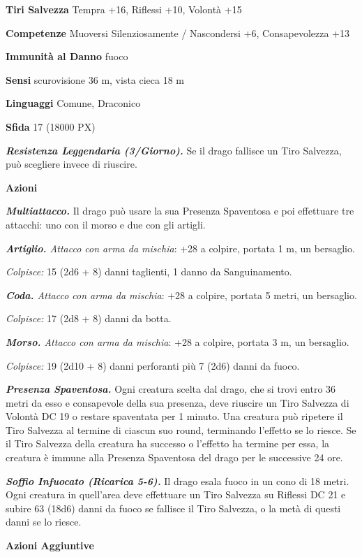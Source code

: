 \begin{multicols}{2}
	\textbf{Tiri Salvezza} Tempra +16, Riflessi +10, Volontà +15

	\textbf{Competenze} Muoversi Silenziosamente / Nascondersi +6, Consapevolezza +13

	\textbf{Immunità al Danno} fuoco

	\textbf{Sensi} scurovisione 36 m, vista cieca 18 m

	\textbf{Linguaggi} Comune, Draconico

	\textbf{Sfida} 17 (18000 PX)

	\textit{\textbf{Resistenza Leggendaria (3/Giorno).}} Se il drago fallisce un Tiro Salvezza, può scegliere invece di riuscire.

	\textbf{Azioni}

	\textit{\textbf{Multiattacco.}} Il drago può usare la sua Presenza Spaventosa e poi effettuare tre attacchi: uno con il morso e due con gli artigli.

	\textit{\textbf{Artiglio.} Attacco con arma da mischia}: +28 a colpire, portata 1 m, un bersaglio.

	\textit{Colpisce:} 15 (2d6 + 8) danni taglienti, 1 danno da Sanguinamento.

	\textit{\textbf{Coda.} Attacco con arma da mischia}: +28 a colpire, portata 5 metri, un bersaglio.

	\textit{Colpisce:} 17 (2d8 + 8) danni da botta.

	\textit{\textbf{Morso.} Attacco con arma da mischia}: +28 a colpire, portata 3 m, un bersaglio.

	\textit{Colpisce:} 19 (2d10 + 8) danni perforanti più 7 (2d6) danni da
	fuoco.

	\textit{\textbf{Presenza Spaventosa.}} Ogni creatura scelta dal drago, che si trovi entro 36 metri da esso e consapevole della sua presenza, deve riuscire un Tiro Salvezza di Volontà DC 19 o restare spaventata per 1 minuto. Una creatura può ripetere il Tiro Salvezza al termine di ciascun suo round, terminando l'effetto se lo riesce. Se il Tiro Salvezza della creatura ha successo o l'effetto ha termine per essa, la creatura è immune alla Presenza Spaventosa del drago per le successive 24 ore.

	\textit{\textbf{Soffio Infuocato (Ricarica 5-6).}} Il drago esala fuoco in un cono di 18 metri. Ogni creatura in quell'area deve effettuare un Tiro Salvezza su Riflessi DC 21 e subire 63 (18d6) danni da fuoco se fallisce il Tiro Salvezza, o la metà di questi danni se lo riesce.

	\textbf{Azioni Aggiuntive}


\end{multicols}
